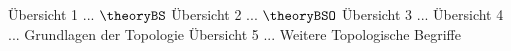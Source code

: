\noindent
Übersicht 1 ... $\theoryBS$
Übersicht 2 ... $\theoryBSO$
Übersicht 3 ... \strukt
Übersicht 4 ... Grundlagen der Topologie
Übersicht 5 ... Weitere Topologische Begriffe
